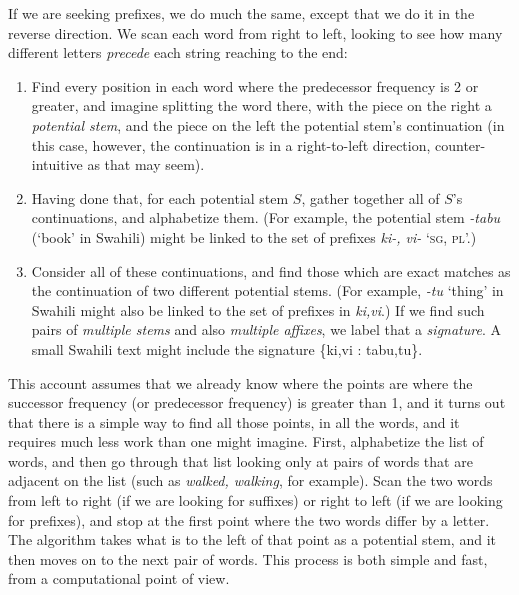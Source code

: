 \documentclass[output=paper,colorlinks,citecolor=brown]{langscibook}
\begin{document}
If we are seeking prefixes, we do much the same, except that we do it in the reverse direction. We scan each word from right to left, looking to see how many different letters \textit{precede} each string reaching to the end:

\begin{enumerate}
\item  Find every position in each word where the predecessor frequency is 2 or greater, and imagine splitting the word there, with the piece on the right a \textit{potential stem}, and the piece on the left the potential stem's continuation (in this case, however, the continuation is in a right-to-left direction, counter-intuitive as that may seem).

\item  Having done that, for each potential stem $S$, gather together all of $S$'s continuations, and alphabetize them. (For example, the potential stem \textit{-tabu} (`book' in Swahili) might be linked to the set of prefixes \textit{ki-, vi-} `\textsc{sg}, \textsc{pl}'.) 

\item  Consider all of these continuations, and find those which are exact matches as the continuation of two different potential stems. (For example, \textit{-tu} `thing' in Swahili might also be linked to the set of prefixes in \textit{ki,vi}.) If we find such pairs of \textit{multiple stems} and also \textit{multiple affixes}, we label that a \textit{signature}.  A small Swahili text might include the signature \{ki,vi : tabu,tu\}.
\end{enumerate}

 


This account assumes that we already know where the points are where the successor frequency (or predecessor frequency) is greater than 1, and it turns out that there is a simple way to find all those points, in all the words, and it requires much less work than one might imagine. First, alphabetize the list of words, and then go through that list looking only at pairs of words that are adjacent on the list (such as \textit{walked, walking}, for example). Scan the two words from left to right (if we are looking for suffixes) or right to left (if we are looking for prefixes), and stop at the first point where the two words differ by a letter. The algorithm takes what is to the left of that point as a potential stem, and it then moves on to the next pair of words. This process is both simple and fast, from a computational point of view.
\end{document}

